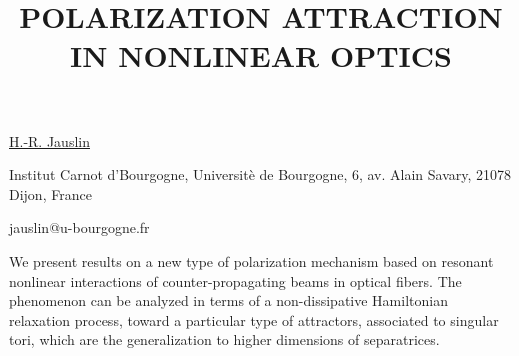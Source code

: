\title{POLARIZATION ATTRACTION IN NONLINEAR OPTICS}

\underline{H.-R. Jauslin} 

{\normalsize{\vspace{-4mm}
Institut Carnot d'Bourgogne, Universit\`e de Bourgogne, 6, av. Alain
Savary, 21078 Dijon, France

\email jauslin@u-bourgogne.fr}}

We present results on a new type of polarization mechanism based on resonant nonlinear interactions of counter-propagating
beams in optical fibers.
The phenomenon can be analyzed in terms of a non-dissipative Hamiltonian relaxation process, toward a particular type of
attractors,  associated to singular tori, which are the generalization to higher dimensions of separatrices.

\vspace{\baselineskip}